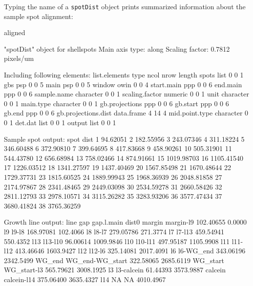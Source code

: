 \documentclass[11pt, a4paper]{article}
\begin{document}
Typing the name of a \texttt{spotDist} object prints summarized information about the sample spot alignment:

\begin{Schunk}
\begin{Sinput}
 aligned
\end{Sinput}
\begin{Soutput}
"spotDist" object for shellspots
Main axis type: along
Scaling factor: 0.7812 pixels/um

Including following elements:
       list.elements       type ncol nrow length
 spots               list          0    0      1
 gbs                 psp           0    0      5
 main                psp           0    0      5
 window              owin          0    0      4
 start.main          ppp           0    0      6
 end.main            ppp           0    0      6
 sample.name         character     0    0      1
 scaling.factor      numeric       0    0      1
 unit                character     0    0      1
 main.type           character     0    0      1
 gb.projections      ppp           0    0      6
 gb.start            ppp           0    0      6
 gb.end              ppp           0    0      6
 gb.projections.dist data.frame    4   14      4
 mid.point.type      character     0    0      1
 det.dat             list          0    0      1
 output              list          0    0      1

Sample spot output:
 spot       dist
   1    94.62051
   2   182.55956
   3   243.07346
   4   311.18224
   5   346.60488
   6   372.90810
   7   399.64695
   8   417.83668
   9   458.90261
   10  505.31901
   11  544.43780
   12  656.68984
   13  758.02466
   14  874.91661
   15 1019.98703
   16 1105.41540
   17 1226.03512
   18 1341.27597
   19 1437.40469
   20 1567.85498
   21 1670.48644
   22 1729.37731
   23 1815.60525
   24 1889.99943
   25 1968.36939
   26 2048.81858
   27 2174.97867
   28 2341.48465
   29 2449.03098
   30 2534.59278
   31 2660.58426
   32 2811.12793
   33 2978.10571
   34 3115.26282
   35 3283.93206
   36 3577.47434
   37 3680.41824
   38 3765.36259

Growth line output:
     line             gap gap.l.main     dist0
 margin   margin-l9        102.40655    0.0000
 l9       l9-l8            168.97081  102.4066
 l8       l8-l7            279.05786  271.3774
 l7       l7-l13           459.54941  550.4352
 l13      l13-l10           96.00614 1009.9846
 l10      l10-l11          497.95187 1105.9908
 l11      l11-l12          413.46646 1603.9427
 l12      l12-l6           325.14081 2017.4091
 l6       l6-WG_end        343.06196 2342.5499
 WG_end   WG_end-WG_start  322.58065 2685.6119
 WG_start WG_start-l3      565.79621 3008.1925
 l3       l3-calcein        61.44393 3573.9887
 calcein  calcein-l14      375.06400 3635.4327
 l14      NA                      NA 4010.4967
\end{Soutput}
\end{Schunk}
\end{document}
